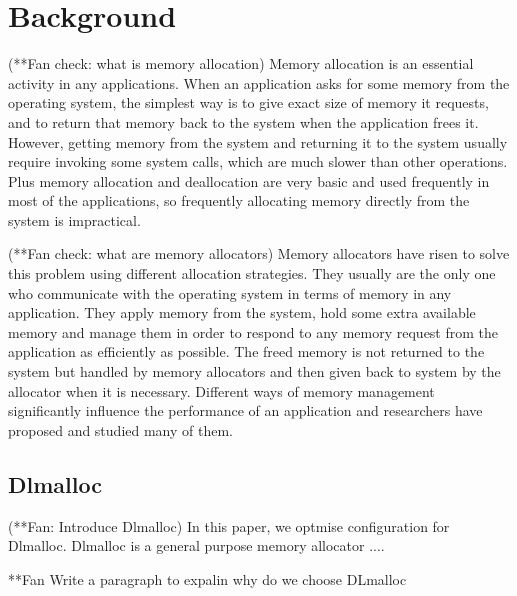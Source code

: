 \section{Background}

(**Fan check: what is memory allocation)
Memory allocation is an essential activity in any applications.
When an application asks for some memory from the operating system, the simplest way is to give exact size of memory it requests, and to return that memory back to the system when the application frees it. However, getting memory from the system and returning it to the system usually require invoking some system calls, which are much slower than other operations. Plus memory allocation and deallocation are very basic and used frequently in most of the applications, so frequently allocating memory directly from the system is impractical. 

(**Fan check: what are memory allocators)
Memory allocators have risen to solve this problem using different allocation strategies. They usually are the only one who communicate with the operating system in terms of memory in any application. They apply memory from the system, hold some extra available memory and manage them in order to respond to any memory request from the application as efficiently as possible. The freed memory is not returned to the system but handled by memory allocators and then given back to system by the allocator when it is necessary. Different ways of memory management significantly influence the performance of an application and researchers have proposed and studied many of them.

\subsection{Dlmalloc}

(**Fan: Introduce Dlmalloc)
In this paper, we optmise configuration for Dlmalloc. Dlmalloc is a general purpose memory allocator ....



**Fan Write a paragraph to expalin why do we choose DLmalloc




